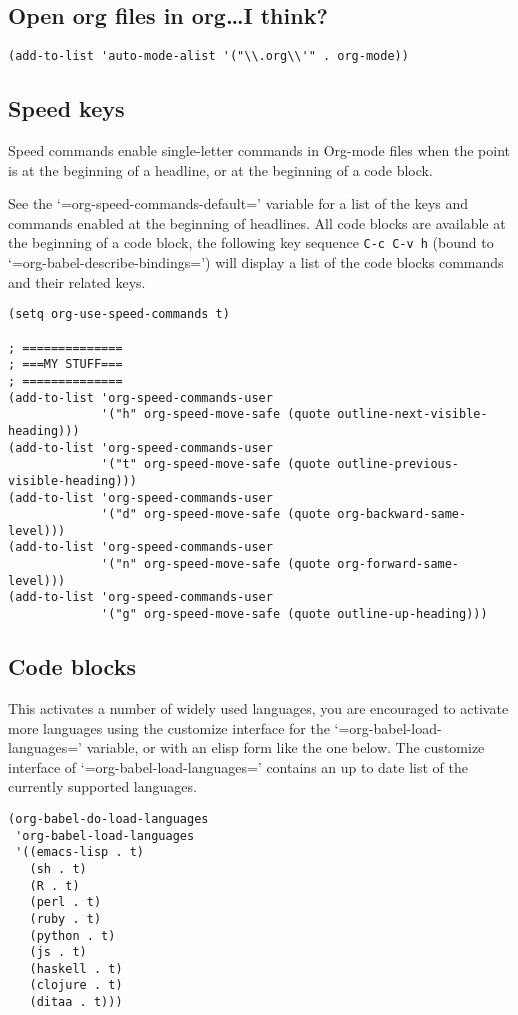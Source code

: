 \documentclass[11pt]{article}
\begin{document}
\subsection*{Open org files in org\ldots{}I think?}
\label{sec-1_4}

\begin{verbatim}
(add-to-list 'auto-mode-alist '("\\.org\\'" . org-mode))
\end{verbatim}
   
\subsection*{Speed keys}
\label{sec-1_5}

Speed commands enable single-letter commands in Org-mode files when
the point is at the beginning of a headline, or at the beginning of a
code block.

See the `=org-speed-commands-default=' variable for a list of the keys
and commands enabled at the beginning of headlines.  All code blocks
are available at the beginning of a code block, the following key
sequence \texttt{C-c C-v h} (bound to `=org-babel-describe-bindings=') will
display a list of the code blocks commands and their related keys.

\begin{verbatim}
(setq org-use-speed-commands t)

; ==============
; ===MY STUFF===
; ==============
(add-to-list 'org-speed-commands-user
             '("h" org-speed-move-safe (quote outline-next-visible-heading)))
(add-to-list 'org-speed-commands-user
             '("t" org-speed-move-safe (quote outline-previous-visible-heading)))
(add-to-list 'org-speed-commands-user
             '("d" org-speed-move-safe (quote org-backward-same-level)))
(add-to-list 'org-speed-commands-user
             '("n" org-speed-move-safe (quote org-forward-same-level)))
(add-to-list 'org-speed-commands-user
             '("g" org-speed-move-safe (quote outline-up-heading)))
\end{verbatim}
\subsection*{Code blocks}
\label{sec-1_6}

This activates a number of widely used languages, you are encouraged
to activate more languages using the customize interface for the
`=org-babel-load-languages=' variable, or with an elisp form like the
one below.  The customize interface of `=org-babel-load-languages='
contains an up to date list of the currently supported languages.
\begin{verbatim}
(org-babel-do-load-languages
 'org-babel-load-languages
 '((emacs-lisp . t)
   (sh . t)
   (R . t)
   (perl . t)
   (ruby . t)
   (python . t)
   (js . t)
   (haskell . t)
   (clojure . t)
   (ditaa . t)))
\end{verbatim}
\end{document}
